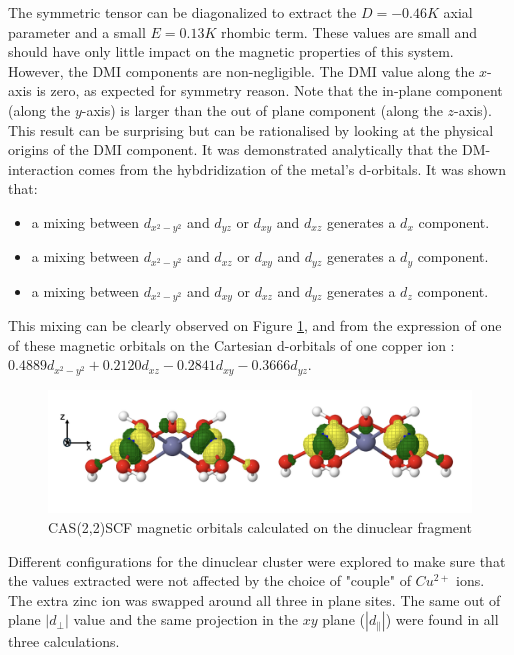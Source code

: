 \documentclass[10pt]{report}
\numberwithin{equation}{section}
\begin{document}
The symmetric tensor can be diagonalized to extract the $ D = - 0.46 K $ axial parameter and a small $ E = 0.13 K$ rhombic term. These values are small and should have only little impact on the magnetic properties of this system.
However, the DMI components are non-negligible. 
The DMI value along the $x$-axis is zero, as expected for symmetry reason. 
Note that the in-plane component (along the $y$-axis) is larger than the out of plane component (along the $z$-axis). 
This result can be surprising but can be rationalised by looking at the physical origins of the DMI component.
It was demonstrated analytically that the DM-interaction comes from the hybdridization of the metal's d-orbitals. 
It was shown that:
\begin{itemize}
    \item a mixing between $ d_{x^2-y^2}$ and $ d_{yz}$ or $ d_{xy}$ and $d_{xz}$ generates a $ d_{x}$ component.
    \item a mixing between $d_{x^2-y^2}$ and $ d_{xz}$ or $ d_{xy}$ and $d_{yz}$ generates a $ d_{y}$ component.
    \item a mixing between $ d_{x^2-y^2}$ and $d_{xy}$ or $ d_{xz}$ and $d_{yz}$ generates a $ d_{z}$ component.
\end{itemize}

This mixing can be clearly observed on Figure \ref{CAS22}, and from the expression of one of these magnetic orbitals on the Cartesian
d-orbitals of one copper ion : $0.4889d_{x^2-y^2}+0.2120d_{xz}-0.2841d_{xy}-0.3666d_{yz}$.

\begin{figure}[!ht]
    \centering
    \includegraphics[width=\textwidth]{Images/CAS22.png}
    \caption{CAS(2,2)SCF magnetic orbitals calculated on the dinuclear fragment}
    \label{CAS22}
\end{figure}


Different configurations for the dinuclear cluster were explored to make sure that the values extracted were not affected by the choice of "couple" of $Cu^{2+}$ ions. 
The extra zinc ion was swapped around all three in plane sites. 
The same out of plane $|d_{\perp}|$ value and the same projection in the $xy$ plane ($|d_{\parallel}|$) were found in all three calculations.
\end{document}

